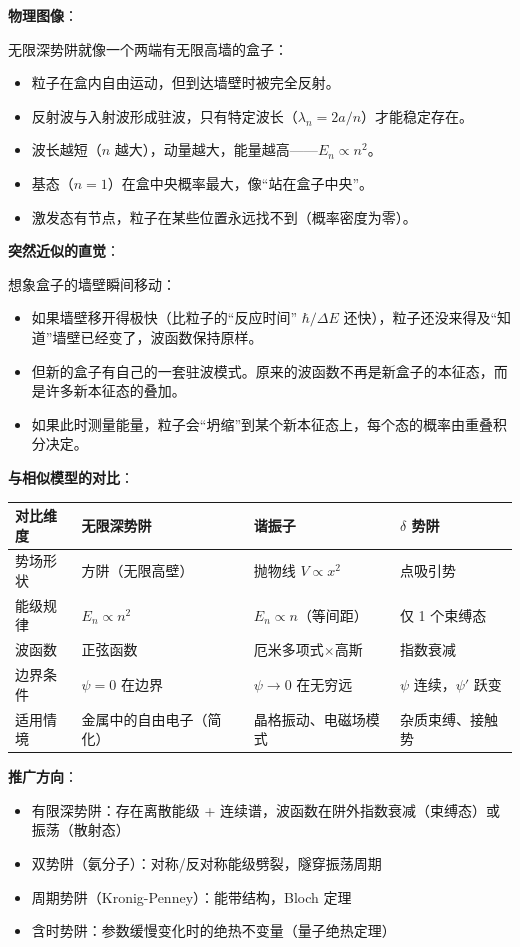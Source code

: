 \begin{insightbox}[物理图像与模型关联]
\textbf{物理图像}：

无限深势阱就像一个两端有无限高墙的盒子：
\begin{itemize}[nosep]
    \item 粒子在盒内自由运动，但到达墙壁时被完全反射。
    \item 反射波与入射波形成驻波，只有特定波长（$\lambda_n=2a/n$）才能稳定存在。
    \item 波长越短（$n$ 越大），动量越大，能量越高——$E_n\propto n^2$。
    \item 基态（$n=1$）在盒中央概率最大，像``站在盒子中央''。
    \item 激发态有节点，粒子在某些位置永远找不到（概率密度为零）。
\end{itemize}

\textbf{突然近似的直觉}：

想象盒子的墙壁瞬间移动：
\begin{itemize}[nosep]
    \item 如果墙壁移开得极快（比粒子的``反应时间'' $\hbar/\Delta E$ 还快），粒子还没来得及``知道''墙壁已经变了，波函数保持原样。
    \item 但新的盒子有自己的一套驻波模式。原来的波函数不再是新盒子的本征态，而是许多新本征态的叠加。
    \item 如果此时测量能量，粒子会``坍缩''到某个新本征态上，每个态的概率由重叠积分决定。
\end{itemize}

\textbf{与相似模型的对比}：
\begin{center}
\begin{tabular}{llll}
\toprule
\textbf{对比维度} & \textbf{无限深势阱} & \textbf{谐振子} & \textbf{$\delta$ 势阱} \\
\midrule
势场形状 & 方阱（无限高壁） & 抛物线 $V\propto x^2$ & 点吸引势 \\
能级规律 & $E_n\propto n^2$ & $E_n\propto n$（等间距） & 仅 1 个束缚态 \\
波函数 & 正弦函数 & 厄米多项式$\times$高斯 & 指数衰减 \\
边界条件 & $\psi=0$ 在边界 & $\psi\to0$ 在无穷远 & $\psi$ 连续，$\psi'$ 跃变 \\
适用情境 & 金属中的自由电子（简化） & 晶格振动、电磁场模式 & 杂质束缚、接触势 \\
\bottomrule
\end{tabular}
\end{center}

\textbf{推广方向}：
\begin{itemize}[nosep]
    \item 有限深势阱：存在离散能级 + 连续谱，波函数在阱外指数衰减（束缚态）或振荡（散射态）
    \item 双势阱（氨分子）：对称/反对称能级劈裂，隧穿振荡周期
    \item 周期势阱（Kronig-Penney）：能带结构，Bloch 定理
    \item 含时势阱：参数缓慢变化时的绝热不变量（量子绝热定理）
\end{itemize}
\end{insightbox}

